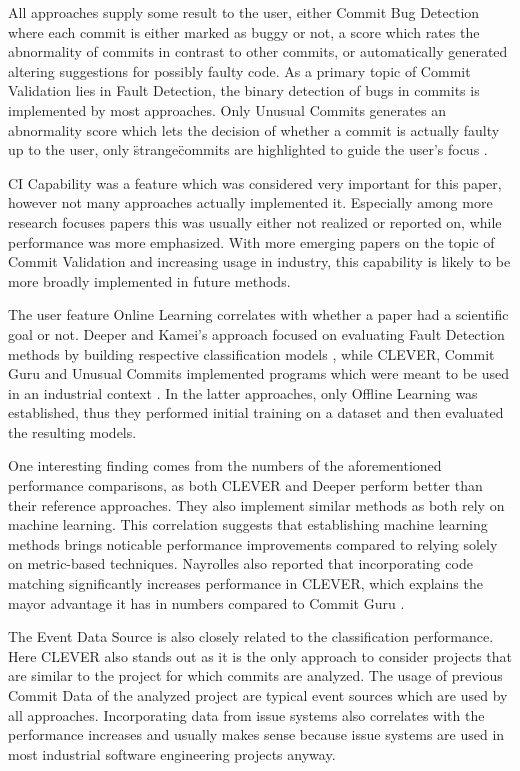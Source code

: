 All approaches supply some result to the user, either Commit Bug Detection where each commit is either marked as buggy or not, a score which rates the abnormality of commits in contrast to other commits, or automatically generated altering suggestions for possibly faulty code. As a primary topic of Commit Validation lies in Fault Detection, the binary detection of bugs in commits is implemented by most approaches. Only Unusual Commits generates an abnormality score which lets the decision of whether a commit is actually faulty up to the user, only \"strange\" commits are highlighted to guide the user's focus \cite{Goyal2017}.

CI Capability was a feature which was considered very important for this paper, however not many approaches actually implemented it. Especially among more research focuses papers this was usually either not realized or reported on, while performance was more emphasized. With more emerging papers on the topic of Commit Validation and increasing usage in industry, this capability is likely to be more broadly implemented in future methods.

The user feature Online Learning correlates with whether a paper had a scientific goal or not. Deeper and Kamei's approach focused on evaluating Fault Detection methods by building respective classification models \cite{Yang2015, Kamei2013}, while CLEVER, Commit Guru and Unusual Commits implemented programs which were meant to be used in an industrial context \cite{Nayrolles2018,Rosen2015,Goyal2017}. In the latter approaches, only Offline Learning was established, thus they performed initial training on a dataset and then evaluated the resulting models.

One interesting finding comes from the numbers of the aforementioned performance comparisons, as both CLEVER and Deeper perform better than their reference approaches. They also implement similar methods as both rely on machine learning. This correlation suggests that establishing machine learning methods brings noticable performance improvements compared to relying solely on metric-based techniques. Nayrolles also reported that incorporating code matching significantly increases performance in CLEVER, which explains the mayor advantage it has in numbers compared to Commit Guru \cite{Nayrolles2018}.

The Event Data Source is also closely related to the classification performance. Here CLEVER also stands out as it is the only approach to consider projects that are similar to the project for which commits are analyzed. The usage of previous Commit Data of the analyzed project are typical event sources which are used by all approaches. Incorporating data from issue systems also correlates with the performance increases and usually makes sense because issue systems are used in most industrial software engineering projects anyway.

